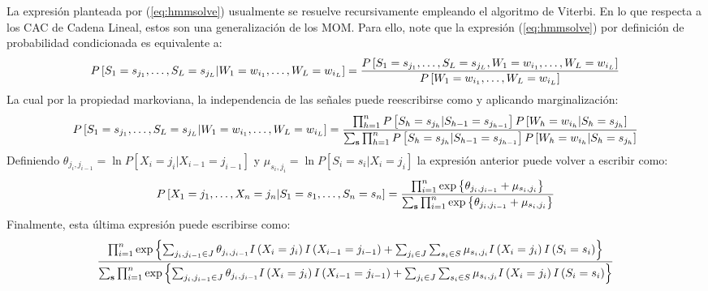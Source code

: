 La expresión planteada por (\ref{eq:hmmsolve}) usualmente se resuelve recursivamente empleando el algoritmo de Viterbi. En lo que respecta a los CAC de Cadena Lineal, estos son una generalización de los MOM. Para ello, note que la expresión (\ref{eq:hmmsolve}) por definición de probabilidad condicionada es equivalente a:
\begin{equation}
	\label{eq:hmmsolveequiv1}
	\scriptsize
	P\left[S_{1} = s_{j_1}, \ldots, S_{L} = s_{j_L} | W_1=w_{i_1},\ldots,W_L=w_{i_L}\right] = \frac{	P\left[S_{1} = s_{j_1}, \ldots, S_{L} = s_{j_L}, W_1=w_{i_1},\ldots,W_L=w_{i_L}\right]}{	P\left[W_1=w_{i_1},\ldots,W_L=w_{i_L}\right]}
\end{equation}
La cual por la propiedad markoviana, la independencia de las señales puede reescribirse como y aplicando marginalización:
\begin{equation}
	\label{eq:hmmsolveequiv2}
	\tiny
		P\left[S_{1} = s_{j_1}, \ldots, S_{L} = s_{j_L} | W_1=w_{i_1},\ldots,W_L=w_{i_L}\right] = \frac{\prod_{h=1}^{n}P\left[S_{h}=s_{j_h}\vert S_{h-1}=s_{j_{h-1}}\right]P\left[W_{h}=w_{i_h}\vert S_{h}=s_{j_h}\right]}{\sum_{\mathbf{s}}\prod_{h=1}^{n}P\left[S_{h}=s_{j_h}\vert S_{h-1}=s_{j_{h-1}}\right]P\left[W_{h}=w_{i_h}\vert S_{h}=s_{j_h}\right]}
\end{equation}
Definiendo $\theta_{j_i,j_{i-1}} = \ln P\left[X_{i}=j_i\vert X_{i-1}=j_{i-1}\right]$ y $\mu_{s_i,j_i} = \ln P\left[S_{i}=s_i\vert X_{i}=j_i\right]$ la expresión anterior puede volver a escribir como:
\begin{equation}
	\label{eq:hmmsolveequiv3}
	\small
	P\left[X_{1} = j_1, \ldots, X_{n} = j_n | S_1=s_1,\ldots,S_n=s_n\right] = \frac{\prod_{i=1}^{n}\exp \left\lbrace \theta_{j_i,j_{i-1}} + \mu_{s_i,j_i} \right\rbrace}{\sum_{\mathbf{s}}\prod_{i=1}^{n}\exp \left\lbrace \theta_{j_i,j_{i-1}} + \mu_{s_i,j_i} \right\rbrace}
\end{equation}
Finalmente, esta última expresión puede escribirse como:
\begin{equation}
	\label{eq:hmmsolveequiv4}
	\scriptsize
	\frac{\prod_{i=1}^{n}\exp \left\lbrace \sum_{j_i,j_{i-1} \in J}\theta_{j_i,j_{i-1}}I\left(X_{i}=j_i\right)I\left(X_{i-1}=j_{i-1}\right) + \sum_{j_i \in J}\sum_{s_i \in S}\mu_{s_i,j_i}I\left(X_{i}=j_i\right)I\left(S_{i}=s_i\right) \right\rbrace}{\sum_{\mathbf{s}}\prod_{i=1}^{n}\exp \left\lbrace \sum_{j_i,j_{i-1} \in J}\theta_{j_i,j_{i-1}}I\left(X_{i}=j_i\right)I\left(X_{i-1}=j_{i-1}\right) + \sum_{j_i \in J}\sum_{s_i \in S}\mu_{s_i,j_i}I\left(X_{i}=j_i\right)I\left(S_{i}=s_i\right) \right\rbrace}
\end{equation}

